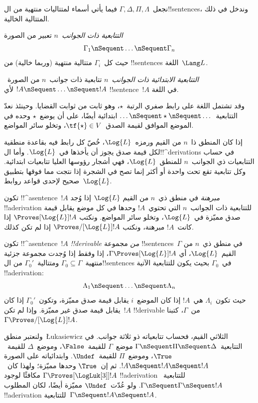 \documentclass[../../../include/open-logic-section]{subfiles}
\begin{document}


نجعل~$\Gamma, \Delta, \Pi, \Lambda$ فيما يأتي أسماء لمتتاليات
منتهية من ال!!{sentence}s، وندخل في ذلك المتتالية الخالية.

\begin{defn}[التتابعية]
\emph{التتابعية ذات الجوانب~$n$} تعبير من الصورة
\[
\Gamma_1 \nSequent \dots \nSequent \Gamma_n
\]
حيث كل~$\Gamma_i$ متتالية منتهية (وربما خالية) من !!{sentence}s
اللغة~$\Lang L$.
\end{defn}

\begin{defn}
\emph{التتابعية الابتدائية ذات الجوانب~$n$} تتابعية ذات جوانب~$n$ من
الصورة~$!A \nSequent \dots \nSequent !A$ لأي !!{sentence}~$!A$ في
اللغة.

وقد تشتمل اللغة على رابط صفري الرتبة~$\star$، وهو ثابت من ثوابت
القضايا. وحينئذ نعدّ التتابعية~$\dots \nSequent \star \nSequent \dots$
ابتدائية أيضًا، على أن يوضع~$\star$ وحده في الموضع الموافق لقيمة
الصدق~$\tf{\star} \in V$، وتخلو سائر المواضع.
\end{defn}

إذا كان المنطق ذا~$n$ من القيم ورمزه~$\Log{L}$، خُصّ كل رابط فيه
بقاعدة منطقية لكل قيمة صدق يجوز أن يأخذها في~$\Log{L}$.
وأما ال!!^{derivation}s في حساب التتابعيات ذي الجوانب~$n$ للمنطق~$\Log{L}$،
فهي أشجار رؤوسها العليا تتابعيات ابتدائية. وكل تتابعية تقع تحت واحدة
أو أكثر إنما تصح في الشجرة إذا نتجت مما فوقها بتطبيق صحيح لإحدى
قواعد روابط~$\Log{L}$.

\begin{defn}[المبرهنات]
تكون !!^a{sentence}~$!A$ \emph{مبرهنة} في منطق ذي~$n$ من القيم
$\Log{L}$ إذا وُجد !!a{derivation} للتتابعية ذات الجوانب~$n$ التي
تحتوي~$!A$ وحدها في كل موضع يقابل قيمة صدق مميّزة في~$\Log{L}$،
وتخلو سائر المواضع. ونكتب
$\Proves[\Log{L}] !A$ إذا كانت~$!A$ مبرهنة، ونكتب
$\Proves/[\Log{L}] !A$ إذا لم تكن كذلك.
\end{defn}

\begin{defn}[!!^{derivability}]
تكون !!^a{sentence}~$!A$ \emph{!!{derivable} من} مجموعة
!!{sentence}s~$\Gamma$ في منطق ذي~$n$ من القيم~$\Log{L}$، أي
$\Gamma \Proves[\Log{L}] !A$، إذا وفقط إذا وُجدت مجموعة جزئية
منتهية~$\Gamma_0 \subseteq \Gamma$ ومتتالية~$\Gamma_0'$ من
ال!!{sentence}s في~$\Gamma_0$ بحيث يكون للتتابعية الآتية
!!a{derivation}:
\[ \Lambda_1 \nSequent \dots \nSequent \Lambda_n \]
حيث تكون~$\Lambda_i$ هي~$!A$ إذا كان الموضع~$i$ يقابل قيمة صدق
مميّزة، وتكون~$\Gamma_0'$ إذا كان يقابل قيمة صدق غير مميّزة. وإذا لم
تكن~$!A$ !!{derivable} من~$\Gamma$، كتبنا
$\Gamma \Proves/[\Log{L}] !A$.
\end{defn}

ولنعتبر منطق~\L ukasiewicz الثلاثي القيم، فحساب تتابعياته ذو ثلاثة
جوانب. في التتابعية~$\Gamma \nSequent \Pi \nSequent \Delta$
موضع~$\Gamma$ للقيمة~$\False$، وموضع~$\Delta$ للقيمة~$\True$،
وموضع~$\Pi$ للقيمة~$\Undef$. وابتدائياته على الصورة
$!A \nSequent !A \nSequent !A$. ثم إن~$\True$ وحدها مميّزة؛
ولهذا كان~$\Gamma \Proves[\LogLuk[3]] !A$ مكافئًا لوجود
!!a{derivation} للتتابعية~$\Gamma \nSequent \Gamma \nSequent !A$.
ولو عُدّت~$\Undef$ مميّزة أيضًا، لكان المطلوب !!a{derivation}
للتتابعية~$\Gamma \nSequent !A \nSequent !A$.
\end{document}
